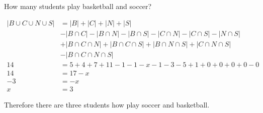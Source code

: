 \documentclass[11pt]{article}
\begin{document}
How many students play basketball and soccer?

\begin{align*}
  |B \cup C \cup N \cup S| &= |B| + |C| + |N| + |S| \\
  &- |B \cap C| - |B \cap N| - |B \cap S| - |C \cap N| - |C \cap S| - |N \cap
  S| \\
  &+|B \cap C \cap N| + |B \cap C \cap S| + |B \cap N \cap S| + |C \cap N \cap
  S| \\
  &- |B \cap C \cap N \cap S| \\
  14 &= 5 + 4 + 7 + 11 - 1 - 1 - x - 1 - 3 - 5 + 1 + 0 + 0 + 0 + 0 - 0 \\
  14 &= 17 - x \\
  -3 &= -x \\
  x &= 3
\end{align*}

Therefore there are three students how play soccer and basketball.
\end{document}
